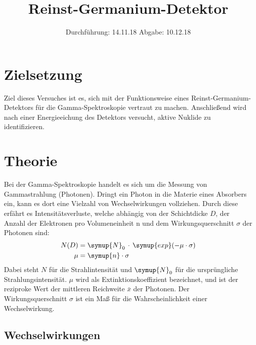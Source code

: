 


\subject{V18}
\title{Reinst-Germanium-Detektor}
\date{%
  Durchführung: 14.11.18
  \hspace{3em}
  Abgabe: 10.12.18
}




\maketitle
\thispagestyle{empty}
\tableofcontents
\newpage

\setcounter{page}{1}
\section*{Zielsetzung}

Ziel dieses Versuches ist es, sich mit der Funktionsweise eines Reinst-Germanium-Detektors
für die Gamma-Spektroskopie vertraut zu machen. Anschließend wird nach einer Energieeichung
des Detektors versucht, aktive Nuklide zu identifizieren.

  \section{Theorie}
    \label{sec:Theorie}

    Bei der Gamma-Spektroskopie handelt es sich um die Messung von Gammastrahlung (Photonen).
    Dringt ein Photon in die Materie eines Absorbers ein, kann es dort eine Vielzahl von Wechselwirkungen vollziehen.
    Durch diese erfährt es Intensitätsverluste, welche abhängig von der
    Schichtdicke $D$, der Anzahl der Elektronen pro Volumeneinheit n und dem Wirkungsquerschnitt $\sigma$ der Photonen sind:
    \begin{align}
      N(D) &= \symup{N}_0\,\cdot\,\symup{exp}(-\mu\cdot\sigma)\\
      \mu &= \symup{n}\cdot\sigma
    \end{align}
    Dabei steht $N$ für die Strahlintensität und $\symup{N}_0$ für die ursprüngliche
    Strahlungsintensität.
    $\mu$ wird als Extinktionskoeffizient bezeichnet, und ist der reziproke Wert der
    mittleren Reichweite $\bar{x}$ der Photonen. Der Wirkungsquerschnitt $\sigma$ ist ein Maß
    für die Wahrscheinlichkeit einer Wechselwirkung.

    \subsection{Wechselwirkungen}
    \label{sec:Wechselwirkungen}


